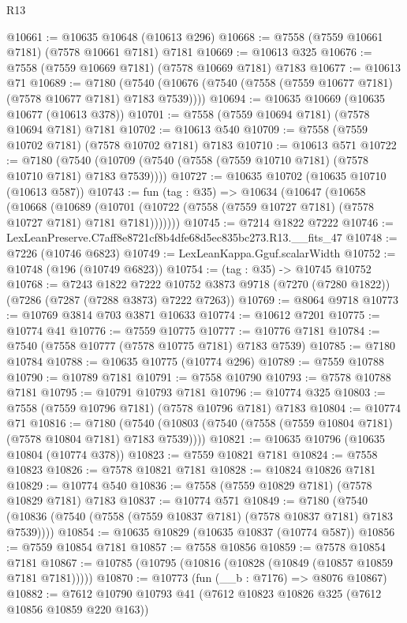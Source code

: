 \begin{lexlean}{R13}
\begin{coremodule}
@10661 := @10635 @10648 (@10613 @296)
@10668 := @7558 (@7559 @10661 @7181) (@7578 @10661 @7181) @7181
@10669 := @10613 @325
@10676 := @7558 (@7559 @10669 @7181) (@7578 @10669 @7181) @7183
@10677 := @10613 @71
@10689 := @7180
    (@7540 (@10676 (@7540 (@7558 (@7559 @10677 @7181) (@7578 @10677 @7181) @7183 @7539))))
@10694 := @10635 @10669 (@10635 @10677 (@10613 @378))
@10701 := @7558 (@7559 @10694 @7181) (@7578 @10694 @7181) @7181
@10702 := @10613 @540
@10709 := @7558 (@7559 @10702 @7181) (@7578 @10702 @7181) @7183
@10710 := @10613 @571
@10722 := @7180
    (@7540 (@10709 (@7540 (@7558 (@7559 @10710 @7181) (@7578 @10710 @7181) @7183 @7539))))
@10727 := @10635 @10702 (@10635 @10710 (@10613 @587))
@10743 := fun (tag : @35) =>
  @10634
    (@10647
      (@10658
        (@10668
          (@10689
            (@10701 (@10722 (@7558 (@7559 @10727 @7181) (@7578 @10727 @7181) @7181 @7181)))))))
@10745 := @7214 @1822 @7222
@10746 := LexLeanPreserve.C7aff8e8721cf8b4dfe68d5ec835bc273.R13.__fits_47
@10748 := @7226 (@10746 @6823)
@10749 := LexLeanKappa.Gguf.scalarWidth
@10752 := @10748 (@196 (@10749 @6823))
@10754 := (tag : @35) -> @10745 @10752
@10768 := @7243
    @1822
    @7222
    @10752
    @3873
    @9718
    (@7270 (@7280 @1822))
    (@7286 (@7287 (@7288 @3873) @7222 @7263))
@10769 := @8064 @9718
@10773 := @10769 @3814 @703 @3871 @10633
@10774 := @10612 @7201
@10775 := @10774 @41
@10776 := @7559 @10775
@10777 := @10776 @7181
@10784 := @7540 (@7558 @10777 (@7578 @10775 @7181) @7183 @7539)
@10785 := @7180 @10784
@10788 := @10635 @10775 (@10774 @296)
@10789 := @7559 @10788
@10790 := @10789 @7181
@10791 := @7558 @10790
@10793 := @7578 @10788 @7181
@10795 := @10791 @10793 @7181
@10796 := @10774 @325
@10803 := @7558 (@7559 @10796 @7181) (@7578 @10796 @7181) @7183
@10804 := @10774 @71
@10816 := @7180
    (@7540 (@10803 (@7540 (@7558 (@7559 @10804 @7181) (@7578 @10804 @7181) @7183 @7539))))
@10821 := @10635 @10796 (@10635 @10804 (@10774 @378))
@10823 := @7559 @10821 @7181
@10824 := @7558 @10823
@10826 := @7578 @10821 @7181
@10828 := @10824 @10826 @7181
@10829 := @10774 @540
@10836 := @7558 (@7559 @10829 @7181) (@7578 @10829 @7181) @7183
@10837 := @10774 @571
@10849 := @7180
    (@7540 (@10836 (@7540 (@7558 (@7559 @10837 @7181) (@7578 @10837 @7181) @7183 @7539))))
@10854 := @10635 @10829 (@10635 @10837 (@10774 @587))
@10856 := @7559 @10854 @7181
@10857 := @7558 @10856
@10859 := @7578 @10854 @7181
@10867 := @10785 (@10795 (@10816 (@10828 (@10849 (@10857 @10859 @7181 @7181)))))
@10870 := @10773 (fun (__b : @7176) => @8076 @10867)
@10882 := @7612 @10790 @10793 @41 (@7612 @10823 @10826 @325 (@7612 @10856 @10859 @220 @163))

\end{coremodule}
\end{lexlean}

